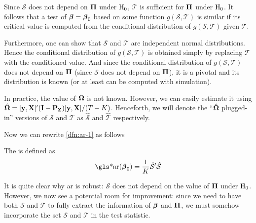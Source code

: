 \documentclass[a4paper]{article}
\begin{document}
\begin{remark}
	Since $\mathcal{S}$ does not depend on $\boldsymbol{\Pi}$ under $\mathrm{H}_0$,
	$\mathcal{T}$ is sufficient for $\boldsymbol{\Pi}$ under $\mathrm{H}_0$.
	It follows that a test of $\boldsymbol{\beta}=\boldsymbol{\beta}_0$ based on some function $g(\mathcal{S},\mathcal{T})$ is similar
	if its critical value is computed from the conditional distribution of $g(\mathcal{S},\mathcal{T})$ given $\mathcal{T}$.
	\parencite{stock-wright-yogo-2002}
\end{remark}

\begin{remark}
	Furthermore, one can show that $\mathcal{S}$ and $\mathcal{T}$ are independent normal distributions.
	Hence the conditional distribution of $g(\mathcal{S},\mathcal{T})$ is obtained
	simply by replacing $\mathcal{T}$ with the conditioned value.
	And since the conditional distribution of $g(\mathcal{S},\mathcal{T})$ does not depend on $\boldsymbol{\Pi}$
	(since $\mathcal{S}$ does not depend on $\boldsymbol{\Pi}$),
	it is a pivotal and its distribution is known (or at least can be computed with simulation).
	\parencite{moreira-2009,shi-2012}
\end{remark}

\begin{remark}
	In practice, the value of $\boldsymbol{\Omega}$ is not known.
	However, we can easily estimate it using $\hat{\boldsymbol{\Omega}}=[\mathbf{y},\mathbf{X}]'(\mathbf{I}-\mathbf{P}_{\mathbf{Z}})[\mathbf{y},\mathbf{X}]/(T-K)$.
	Henceforth, we will denote the ``$\hat{\boldsymbol{\Omega}}$ plugged-in'' versions of $\mathcal{S}$ and $\mathcal{T}$
	as $\hat{\mathcal{S}}$ and $\hat{\mathcal{T}}$ respectively.
	\parencite{stock-wright-yogo-2002}
\end{remark}

Now we can rewrite \autoref{dfn:ar-1} as follows

\begin{definition}[\glsentrylong{ar}]\label{dfn:ar-2}
	The  is defined as
	\begin{align*}
		\text{\gls*{ar}}(\bbeta_0)
		= \frac1K \hat{\mathcal{S}}\T \hat{\mathcal{S}}
	\end{align*}
\end{definition}

\begin{remark}
	It is quite clear why \gls*{ar} is robust:
	$\mathcal{S}$ does not depend on the value of $\boldsymbol{\Pi}$ under $\mathrm{H}_0$.
	However, we now see a potential room for improvement:
	since we need to have both $\mathcal{S}$ and $\mathcal{T}$ to fully extract the information of $\boldsymbol{\beta}$ and $\boldsymbol{\Pi}$,
	we must somehow incorporate the set $\mathcal{S}$ and $\mathcal{T}$ in the test statistic.
\end{remark}
\end{document}
